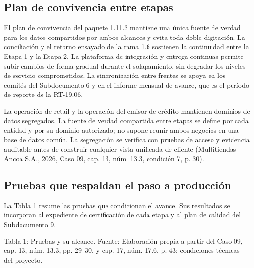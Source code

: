 \documentclass[11pt]{article}
\begin{document}
\subsection*{Plan de convivencia entre etapas}

El plan de convivencia del paquete 1.11.3 mantiene una única fuente de verdad para los datos compartidos por ambos alcances y evita toda doble digitación. La conciliación y el retorno ensayado de la rama 1.6 sostienen la continuidad entre la Etapa 1 y la Etapa 2. La plataforma de integración y entrega continuas permite subir cambios de forma gradual durante el solapamiento, sin degradar los niveles de servicio comprometidos. La sincronización entre frentes se apoya en los comités del Subdocumento 6 y en el informe mensual de avance, que es el período de reporte de la RT-19.06.

La operación de retail y la operación del emisor de crédito mantienen dominios de datos segregados. La fuente de verdad compartida entre etapas se define por cada entidad y por su dominio autorizado; no supone reunir ambos negocios en una base de datos común. La segregación se verifica con pruebas de acceso y evidencia auditable antes de construir cualquier vista unificada de cliente (Multitiendas Ancoa S.A., 2026, Caso 09, cap. 13, núm. 13.3, condición 7, p. 30).

\subsection*{Pruebas que respaldan el paso a producción}

La Tabla 1 resume las pruebas que condicionan el avance. Sus resultados se incorporan al expediente de certificación de cada etapa y al plan de calidad del Subdocumento 9.

Tabla 1: Pruebas y su alcance. Fuente: Elaboración propia a partir del Caso 09, cap. 13, núm. 13.3, pp. 29–30, y cap. 17, núm. 17.6, p. 43; condiciones técnicas del proyecto.
\end{document}
